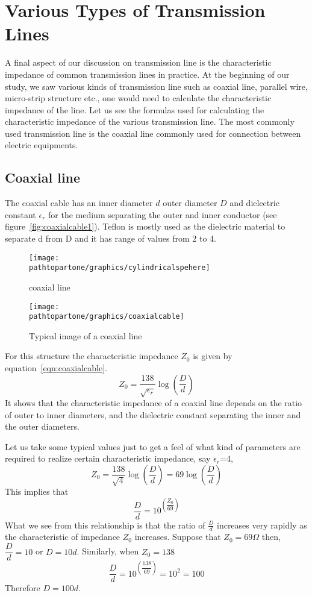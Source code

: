 \section{Various Types of Transmission Lines}\label{lec:lec15}
A final aspect of our discussion on transmission line is the characteristic impedance of common transmission lines in practice. At the beginning of our study, we saw various kinds of transmission line such as coaxial line, parallel wire, micro-strip structure etc., one would need to calculate the characteristic impedance of the line. Let us see the formulas used for calculating the characteristic impedance of the various transmission line. The most commonly used transmission line is the coaxial line commonly used for connection between electric equipments.

\subsection{Coaxial line}
The coaxial cable has an inner diameter $d$ outer diameter $D$ and dielectric constant $\epsilon_r$ for the medium separating the outer and inner conductor (see figure~\ref{fig:coaxialcable1}). Teflon is mostly used as the dielectric material to separate d from D and it has range of values from 2 to 4.
\begin{figure}[h]
\centering
\texttt{[image: \\pathtopartone/graphics/cylindricalspehere]}
\caption{coaxial line}
\label{fig:cylindricalspehere}
\end{figure}
\begin{figure}[h]
\centering
\texttt{[image: \\pathtopartone/graphics/coaxialcable]}
\caption{Typical image of a coaxial line}
\end{figure}

For this structure the characteristic impedance $Z_0$ is given by equation~\eqref{eqn:coaxialcable}.
\begin{equation}
Z_0 =\frac{138}{\sqrt{\epsilon_r}}\log(\dfrac{D}{d})
\label{eqn:coaxialcable}
\end{equation}
It shows that the characteristic impedance of a coaxial line depends on the ratio of outer to inner diameters, and the dielectric constant separating the inner and the outer diameters.

Let us take some typical values just to get a feel of what kind of parameters are required to realize certain characteristic impedance, say $\epsilon_r$=4, 
\begin{dmath*}
Z_0 =\dfrac{138}{\sqrt{4}}\log(\dfrac{D}{d})
= 69\log(\dfrac{D}{d})
\end{dmath*}
This implies that
\begin{dmath*}
\frac{D}{d}=10^{\left(\dfrac{Z_0 }{69}\right)}
\end{dmath*}
What we see from this relationship is that the ratio of $\frac{D}{d}$ increases very rapidly as the characteristic of impedance $Z_0 $ increases. Suppose that $Z_0 = 69\varOmega$ then, $\dfrac{D}{d}= 10$ or $D=10d$. Similarly, when $Z_0 = 138$
\begin{dmath*}
\dfrac{D}{d}=10^{\left(\dfrac{138}{69}\right)}=10^{2}=100
\end{dmath*}
Therefore $D=100d$.


